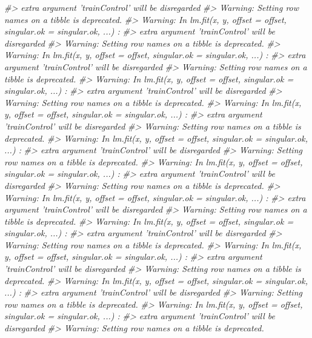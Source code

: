 \documentclass[]{book}
\newenvironment{Shaded}{\begin{snugshade}}{\end{snugshade}}
\newcommand{\CommentTok}[1]{\textcolor[rgb]{0.56,0.35,0.01}{\textit{#1}}}
\begin{document}
\begin{Shaded}
\begin{Highlighting}[]
\CommentTok{#>  extra argument 'trainControl' will be disregarded}
\CommentTok{#> Warning: Setting row names on a tibble is deprecated.}
\CommentTok{#> Warning: In lm.fit(x, y, offset = offset, singular.ok = singular.ok, ...) :}
\CommentTok{#>  extra argument 'trainControl' will be disregarded}
\CommentTok{#> Warning: Setting row names on a tibble is deprecated.}
\CommentTok{#> Warning: In lm.fit(x, y, offset = offset, singular.ok = singular.ok, ...) :}
\CommentTok{#>  extra argument 'trainControl' will be disregarded}
\CommentTok{#> Warning: Setting row names on a tibble is deprecated.}
\CommentTok{#> Warning: In lm.fit(x, y, offset = offset, singular.ok = singular.ok, ...) :}
\CommentTok{#>  extra argument 'trainControl' will be disregarded}
\CommentTok{#> Warning: Setting row names on a tibble is deprecated.}
\CommentTok{#> Warning: In lm.fit(x, y, offset = offset, singular.ok = singular.ok, ...) :}
\CommentTok{#>  extra argument 'trainControl' will be disregarded}
\CommentTok{#> Warning: Setting row names on a tibble is deprecated.}
\CommentTok{#> Warning: In lm.fit(x, y, offset = offset, singular.ok = singular.ok, ...) :}
\CommentTok{#>  extra argument 'trainControl' will be disregarded}
\CommentTok{#> Warning: Setting row names on a tibble is deprecated.}
\CommentTok{#> Warning: In lm.fit(x, y, offset = offset, singular.ok = singular.ok, ...) :}
\CommentTok{#>  extra argument 'trainControl' will be disregarded}
\CommentTok{#> Warning: Setting row names on a tibble is deprecated.}
\CommentTok{#> Warning: In lm.fit(x, y, offset = offset, singular.ok = singular.ok, ...) :}
\CommentTok{#>  extra argument 'trainControl' will be disregarded}
\CommentTok{#> Warning: Setting row names on a tibble is deprecated.}
\CommentTok{#> Warning: In lm.fit(x, y, offset = offset, singular.ok = singular.ok, ...) :}
\CommentTok{#>  extra argument 'trainControl' will be disregarded}
\CommentTok{#> Warning: Setting row names on a tibble is deprecated.}
\CommentTok{#> Warning: In lm.fit(x, y, offset = offset, singular.ok = singular.ok, ...) :}
\CommentTok{#>  extra argument 'trainControl' will be disregarded}
\CommentTok{#> Warning: Setting row names on a tibble is deprecated.}
\CommentTok{#> Warning: In lm.fit(x, y, offset = offset, singular.ok = singular.ok, ...) :}
\CommentTok{#>  extra argument 'trainControl' will be disregarded}
\CommentTok{#> Warning: Setting row names on a tibble is deprecated.}
\CommentTok{#> Warning: In lm.fit(x, y, offset = offset, singular.ok = singular.ok, ...) :}
\CommentTok{#>  extra argument 'trainControl' will be disregarded}
\CommentTok{#> Warning: Setting row names on a tibble is deprecated.}

\end{Highlighting}
\end{Shaded}
\end{document}
